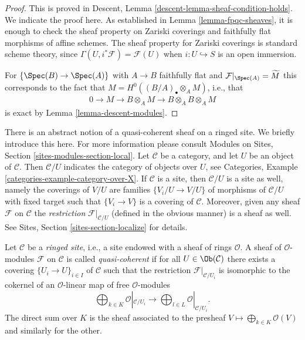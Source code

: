\begin{proof}
This is proved in
Descent, Lemma \ref{descent-lemma-sheaf-condition-holds}.
We indicate the proof here. As established in
Lemma \ref{lemma-fpqc-sheaves},
it is enough to check the sheaf property
on Zariski coverings and faithfully flat morphisms of affine schemes. The
sheaf property for Zariski coverings is standard scheme theory, since
$\Gamma(U, i^\ast \mathcal{F}) = \mathcal{F}(U)$ when
$i : U \hookrightarrow S$ is an open immersion.

\medskip\noindent
For $\left\{\Spec(B)\to \Spec(A)\right\}$ with $A\to B$ faithfully
flat and
$\mathcal{F}|_{\Spec(A)} = \widetilde{M}$
this corresponds to the fact that
$M = H^0\left((B/A)_\bullet \otimes_A M \right)$, i.e., that
\begin{align*}
0 \to M \to B \otimes_A M \to B \otimes_A B \otimes_A M
\end{align*}
is exact by
Lemma \ref{lemma-descent-modules}.
\end{proof}

\noindent
There is an abstract notion of a quasi-coherent sheaf on a ringed site.
We briefly introduce this here. For more information please consult
Modules on Sites, Section \ref{sites-modules-section-local}.
Let $\mathcal{C}$ be a category, and let $U$ be an object of $\mathcal{C}$.
Then $\mathcal{C}/U$ indicates the category of objects over $U$, see
Categories, Example \ref{categories-example-category-over-X}.
If $\mathcal{C}$ is a site, then $\mathcal{C}/U$ is a site as well, namely
the coverings of $V/U$ are families $\{V_i/U \to V/U\}$ of morphisms
of $\mathcal{C}/U$ with fixed target such that
$\{V_i \to V\}$ is a covering of $\mathcal{C}$. Moreover, given any
sheaf $\mathcal{F}$ on $\mathcal{C}$ the {\it restriction}
$\mathcal{F}|_{\mathcal{C}/U}$ (defined in the obvious manner)
is a sheaf as well. See
Sites, Section \ref{sites-section-localize}
for details.

\begin{definition}
\label{definition-ringed-site}
Let $\mathcal{C}$ be a {\it ringed site}, i.e., a site endowed with a
sheaf of rings $\mathcal{O}$. A sheaf of $\mathcal{O}$-modules $\mathcal{F}$ on
$\mathcal{C}$ is called {\it quasi-coherent} if for all
$U \in \Ob(\mathcal{C})$ there exists a covering
$\{U_i \to U\}_{i\in I}$ of $\mathcal{C}$ such that the restriction
$\mathcal{F}|_{\mathcal{C}/U_i}$ is isomorphic to the cokernel of
an $\mathcal{O}$-linear map of free $\mathcal{O}$-modules
$$
\bigoplus\nolimits_{k \in K} \mathcal{O}|_{\mathcal{C}/U_i}
\longrightarrow
\bigoplus\nolimits_{l \in L} \mathcal{O}|_{\mathcal{C}/U_i}.
$$
The direct sum over $K$ is the sheaf associated to the presheaf
$V \mapsto \bigoplus_{k \in K} \mathcal{O}(V)$ and similarly for the other.
\end{definition}

